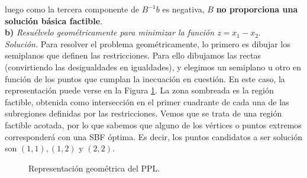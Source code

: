 \documentclass[11pt,a4paper]{article}
\begin{document}
  luego como la tercera componente de $B^{-1}b$ es negativa, $B$ \textbf{no proporciona una solución básica factible}.\\

\textbf{b)} \emph{Resuélvelo geométricamente para minimizar la función \( z = x_{1} - x_{2} \)}.\\

\textit{Solución.} Para resolver el problema geométricamente, lo primero es dibujar los semiplanos que definen las restricciones. Para ello dibujamos las rectas (convirtiendo las desigualdades en igualdades), y elegimos un semiplano u otro en función de los puntos que cumplan la inecuación en cuestión. En este caso, la representación puede verse en la Figura \ref{fig:1}. La zona sombreada es la región factible, obtenida como intersección en el primer cuadrante de cada una de las subregiones definidas por las restricciones. Vemos que se trata de una región factible acotada, por lo que sabemos que alguno de los vértices o puntos extremos corresponderá con una SBF óptima. Es decir, los puntos candidatos a ser solución son $(1,1), (1,2)$ y $(2,2)$.

\begin{figure}[h!]
\centering
{}
\caption{Representación geométrica del PPL.}
\label{fig:1}
\end{figure}
\end{document}
